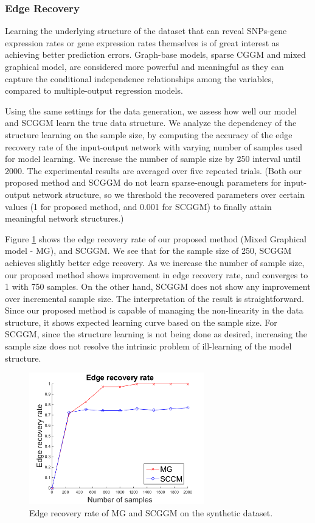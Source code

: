 \documentclass{article}
\begin{document}
\subsubsection{Edge Recovery}
Learning the underlying structure of the dataset that can reveal SNPs-gene expression rates or gene expression rates themselves is of great interest as achieving better prediction errors. Graph-base models, sparse CGGM and mixed graphical model, are considered more powerful and meaningful as they can capture the conditional independence relationships among the variables, compared to multiple-output regression models.

Using the same settings for the data generation, we assess how well our model and SCGGM learn the true data structure.
We analyze the dependency of the structure learning on the sample size, by computing the accuracy of the edge recovery rate of the input-output network with varying number of samples used for model learning.
We increase the number of sample size by 250 interval until 2000.
The experimental results are averaged over five repeated trials.
(Both our proposed method and SCGGM do not learn sparse-enough parameters for input-output network structure, so we threshold the recovered parameters over certain values (1 for proposed method, and 0.001 for SCGGM) to finally attain meaningful network structures.)

Figure \ref{fig:syn_edge_rec} shows the edge recovery rate of our proposed method (Mixed Graphical model - MG), and SCGGM.
We see that for the sample size of 250, SCGGM achieves slightly better edge recovery. 
As we increase the number of sample size, our proposed method shows improvement in edge recovery rate, and converges to 1 with 750 samples. 
On the other hand, SCGGM does not show any improvement over incremental sample size.
The interpretation of the result is straightforward.
Since our proposed method is capable of managing the non-linearity in the data structure, it shows expected learning curve based on the sample size.
For SCGGM, since the structure learning is not being done as desired, increasing the sample size does not resolve the intrinsic problem of ill-learning of the model structure.

\begin{figure}[h]
  \centering
  \includegraphics[width=3in]{figure/EdgeRecRate2.png}
  \caption[] {Edge recovery rate of MG and SCGGM on the synthetic dataset.\label{fig:syn_edge_rec}}
\end{figure}
\end{document}
